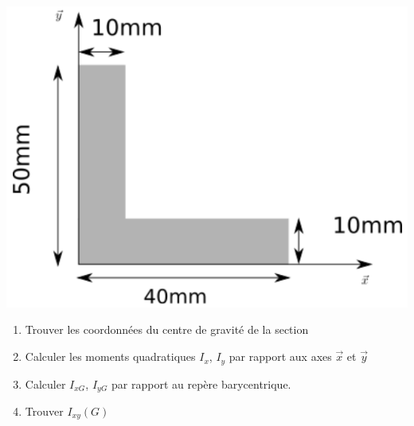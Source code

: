 \documentclass[lecture.tex]{subfiles}
\begin{document}
\exercice{}


\begin{center}
  \includegraphics[scale=0.3]{exo-moment-quadratique-section-L.png}
\end{center}

\begin{enumerate}
  \item Trouver les coordonnées du centre de gravité de la section
  \item Calculer les moments quadratiques $I_x$, $I_y$ par rapport aux axes $\vec{x}$ et $\vec{y}$
  \item Calculer $I_{xG}$, $I_{yG}$ par rapport au repère barycentrique.
  \item Trouver $I_{xy}(G)$
\end{enumerate}

\finexercice
\end{document}
